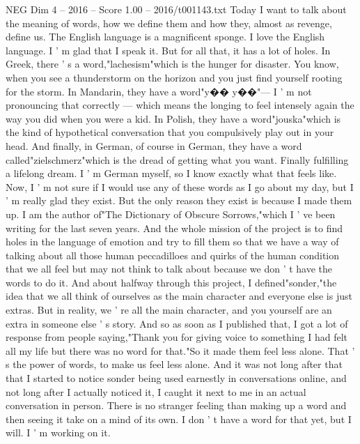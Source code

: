 \begin{textsample}{NEG Dim 4 – 2016 – Score 1.00 – 2016/t001143.txt}  \label{ex:f4_neg_043}
Today I want to talk about the meaning of words, how we define them and how they, almost as revenge, define us.
The English language is a magnificent sponge.
I love the English language.
I ' m glad that I speak it.
But for all that, it has a lot of holes.
In Greek, there ' s a word,"lachesism"which is the hunger for disaster.
You know, when you see a thunderstorm on the horizon and you just find yourself rooting for the storm.
In Mandarin, they have a word"y{\EmojiFont �}{\EmojiFont �} y{\EmojiFont �}{\EmojiFont �}"— I ' m not pronouncing that correctly — which means the longing to feel intensely again the way you did when you were a kid.
In Polish, they have a word"jouska"which is the kind of hypothetical conversation that you compulsively play out in your head.
And finally, in German, of course in German, they have a word called"zielschmerz"which is the dread of getting what you want.
Finally fulfilling a lifelong dream.
I ' m German myself, so I know exactly what that feels like.
Now, I ' m not sure if I would use any of these words as I go about my day, but I ' m really glad they exist.
But the only reason they exist is because I made them up.
I am the author of"The Dictionary of Obscure Sorrows,"which I ' ve been writing for the last seven years.
And the whole mission of the project is to find holes in the language of emotion and try to fill them so that we have a way of talking about all those human peccadilloes and quirks of the human condition that we all feel but may not think to talk about because we don ' t have the words to do it.
And about halfway through this project, I defined"sonder,"the idea that we all think of ourselves as the main character and everyone else is just extras.
But in reality, we ' re all the main character, and you yourself are an extra in someone else ' s story.
And so as soon as I published that, I got a lot of response from people saying,"Thank you for giving voice to something I had felt all my life but there was no word for that."So it made them feel less alone.
That ' s the power of words, to make us feel less alone.
And it was not long after that that I started to notice sonder being used earnestly in conversations online, and not long after I actually noticed it, I caught it next to me in an actual conversation in person.
There is no stranger feeling than making up a word and then seeing it take on a mind of its own.
I don ' t have a word for that yet, but I will.
I ' m working on it.

\end{textsample}
